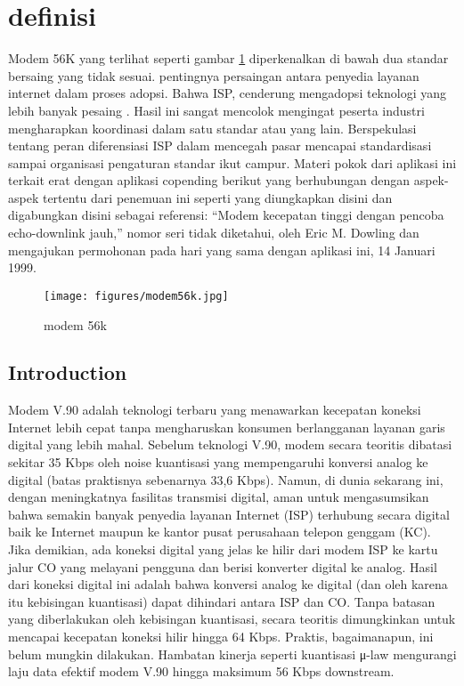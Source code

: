 \section{definisi}
Modem 56K yang terlihat seperti gambar \ref{modem56k} diperkenalkan di bawah dua standar bersaing yang tidak sesuai. pentingnya persaingan antara penyedia layanan internet dalam proses adopsi.
Bahwa ISP, cenderung mengadopsi teknologi yang lebih banyak pesaing . Hasil ini sangat mencolok mengingat peserta industri mengharapkan koordinasi dalam satu standar atau yang lain.
Berspekulasi tentang peran diferensiasi ISP dalam mencegah pasar mencapai standardisasi sampai organisasi pengaturan standar ikut campur.
Materi pokok dari aplikasi ini terkait erat dengan aplikasi copending berikut yang berhubungan dengan aspek-aspek tertentu dari penemuan ini seperti yang diungkapkan disini dan digabungkan disini sebagai referensi: ``Modem kecepatan tinggi dengan pencoba echo-downlink jauh,'' nomor seri tidak diketahui, oleh Eric M. Dowling dan mengajukan permohonan pada hari yang sama dengan aplikasi ini, 14 Januari 1999.
\begin{figure}[ht]
	\centerline{\texttt{[image: figures/modem56k.jpg]}}
	\caption{modem 56k}
	\label{modem56k}
	\end{figure}
	
\subsection{Introduction} Modem V.90 adalah teknologi terbaru yang menawarkan kecepatan koneksi Internet lebih cepat tanpa mengharuskan konsumen berlangganan layanan garis digital yang lebih mahal. Sebelum teknologi V.90, modem secara teoritis dibatasi sekitar 35 Kbps oleh noise kuantisasi yang mempengaruhi konversi analog ke digital (batas praktisnya sebenarnya 33,6 Kbps). Namun, di dunia sekarang ini, dengan meningkatnya fasilitas transmisi digital, aman untuk mengasumsikan bahwa semakin banyak penyedia layanan Internet (ISP) terhubung secara digital baik ke Internet maupun ke kantor pusat perusahaan telepon genggam (KC). Jika demikian, ada koneksi digital yang jelas ke hilir dari modem ISP ke kartu jalur CO yang melayani pengguna dan berisi konverter digital ke analog. Hasil dari koneksi digital ini adalah bahwa konversi analog ke digital (dan oleh karena itu kebisingan kuantisasi) dapat dihindari antara ISP dan CO. Tanpa batasan yang diberlakukan oleh kebisingan kuantisasi, secara teoritis dimungkinkan untuk mencapai kecepatan koneksi hilir hingga 64 Kbps. Praktis, bagaimanapun, ini belum mungkin dilakukan. Hambatan kinerja seperti kuantisasi μ-law mengurangi laju data efektif modem V.90 hingga maksimum 56 Kbps downstream.

